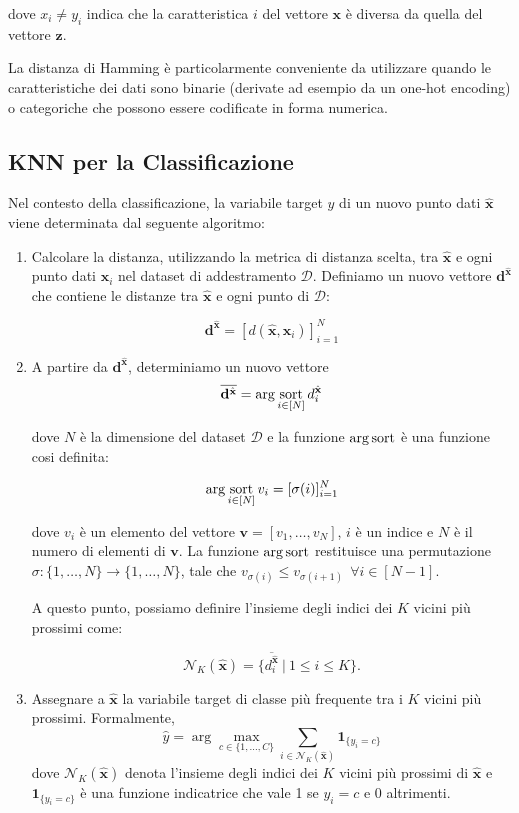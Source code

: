 dove $x_i \neq y_i$ indica che la caratteristica $i$ del vettore $\mathbf{x}$ è diversa da quella del vettore $\mathbf{z}$.

La distanza di Hamming è particolarmente conveniente da utilizzare quando le 
caratteristiche dei dati sono binarie (derivate ad esempio da un one-hot encoding) o categoriche 
che possono essere codificate in forma numerica.

\subsection{KNN per la Classificazione}

Nel contesto della classificazione, la variabile target \( \hat{y} \) di un nuovo punto dati \( \hat{\mathbf{x}} \) 
viene determinata dal seguente algoritmo:

\begin{enumerate}
    \item Calcolare la distanza, utilizzando la metrica di distanza scelta, tra \( \hat{\mathbf{x}} \) e 
    ogni punto dati \( \mathbf{x}_i \) nel dataset 
    di addestramento \( \mathcal{D} \). Definiamo un nuovo vettore $\mathbf d^{\hat{\mathbf x}}$ che contiene le distanze 
    tra \( \hat{\mathbf{x}} \) e ogni punto di \(\mathcal{D}\):

    $$
    \mathbf d^{\hat{\mathbf x}} = [d(\hat{\mathbf{x}}, \mathbf{x}_i)]^N_{i=1}
    $$

    \item A partire da $\mathbf d^{\hat{\mathbf x}}$, determiniamo un nuovo vettore 
    $$
    \overline{\mathbf d^{\hat{\mathbf x}}} = \arg\operatorname*{sort}_{i \in [N]} d^{\hat{\mathbf x}}_i
    $$

    dove $N$ è la dimensione del dataset $\mathcal D$ e la funzione $\arg\operatorname*{sort}$ è una funzione cosi definita:
    
    $$
    \arg\operatorname*{sort}_{i \in [N]} v_i = [\sigma(i)]^N_{i=1}
    $$

    dove $v_i$ è un elemento del vettore $\mathbf v = [v_1, \ldots, v_N]$, $i$ è un indice e $N$ è il numero di elementi di $\mathbf v$.
    La funzione $\arg\operatorname*{sort}$ restituisce una permutazione $\sigma: \{1, \ldots, N\} \rightarrow \{1, \ldots, N\}$, tale che 
    $v_{\sigma(i)} \leq v_{\sigma(i+1)} \ \ \forall i \in [N-1]$.

    A questo punto, possiamo definire l'insieme degli indici dei \( K \) vicini più prossimi come:

    $$
    \mathcal{N}_K(\hat{\mathbf{x}}) = \{\overline{d^{\hat{\mathbf x}}_i} \ | \ 1 \leq i \leq K\}.
    $$

    \item Assegnare a \( \hat{\mathbf{x}} \) la variabile target di classe più frequente tra i \( K \) vicini più prossimi. Formalmente,
    \[
    \hat{y} = \arg\max_{c \in \{1, \ldots, C\}} \sum_{i \in \mathcal{N}_K(\hat{\mathbf{x}})} \mathbf{1}_{\{y_i = c\}}
    \]
    dove \( \mathcal{N}_K(\hat{\mathbf{x}}) \) denota l'insieme degli indici dei \( K \) vicini più prossimi 
    di \( \hat{\mathbf{x}} \) e \( \mathbf{1}_{\{y_i = c\}} \) è una funzione indicatrice che vale 1 se \( y_i = c \) e 0 altrimenti.
\end{enumerate}

